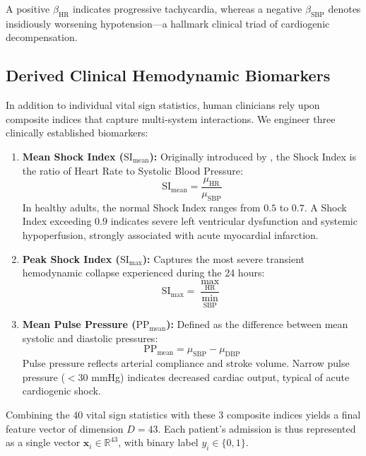 \documentclass[12pt,a4paper,oneside]{report}
\begin{document}
A positive $\beta_{\text{HR}}$ indicates progressive tachycardia, whereas a negative $\beta_{\text{SBP}}$ denotes insidiously worsening hypotension—a hallmark clinical triad of cardiogenic decompensation.

\subsection{Derived Clinical Hemodynamic Biomarkers}
\label{subsec:derived_biomarkers}

In addition to individual vital sign statistics, human clinicians rely upon composite indices that capture multi-system interactions. We engineer three clinically established biomarkers:

\begin{enumerate}
    \item \textbf{Mean Shock Index ($\text{SI}_{\text{mean}}$):} Originally introduced by \citet{allgower1967shock}, the Shock Index is the ratio of Heart Rate to Systolic Blood Pressure:
    \begin{equation}
    \text{SI}_{\text{mean}} = \frac{\mu_{\text{HR}}}{\mu_{\text{SBP}}}
    \end{equation}
    In healthy adults, the normal Shock Index ranges from $0.5$ to $0.7$. A Shock Index exceeding $0.9$ indicates severe left ventricular dysfunction and systemic hypoperfusion, strongly associated with acute myocardial infarction.
    
    \item \textbf{Peak Shock Index ($\text{SI}_{\text{max}}$):} Captures the most severe transient hemodynamic collapse experienced during the 24 hours:
    \begin{equation}
    \text{SI}_{\text{max}} = \frac{\max_{\text{HR}}}{\min_{\text{SBP}}}
    \end{equation}
    
    \item \textbf{Mean Pulse Pressure ($\text{PP}_{\text{mean}}$):} Defined as the difference between mean systolic and diastolic pressures:
    \begin{equation}
    \text{PP}_{\text{mean}} = \mu_{\text{SBP}} - \mu_{\text{DBP}}
    \end{equation}
    Pulse pressure reflects arterial compliance and stroke volume. Narrow pulse pressure ($< 30$ mmHg) indicates decreased cardiac output, typical of acute cardiogenic shock.
\end{enumerate}

Combining the 40 vital sign statistics with these 3 composite indices yields a final feature vector of dimension $D = 43$. Each patient's admission is thus represented as a single vector $\mathbf{x}_i \in \mathbb{R}^{43}$, with binary label $y_i \in \{0, 1\}$.
\end{document}
